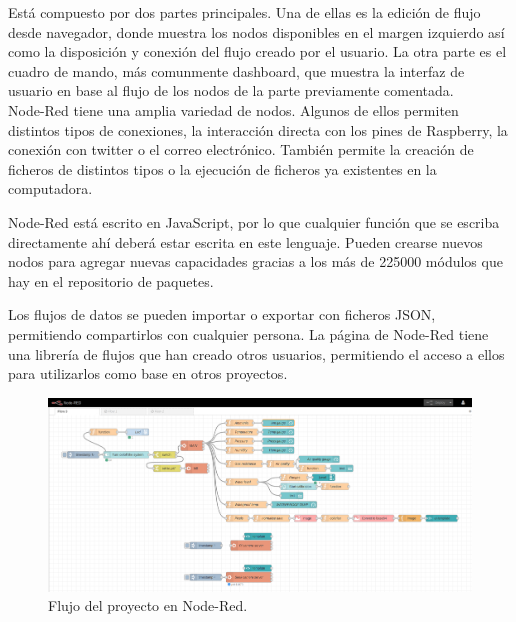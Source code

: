 Está compuesto por dos partes principales. Una de ellas es la edición de flujo desde navegador, donde muestra los nodos disponibles en el margen izquierdo así como la disposición y conexión del flujo creado por el usuario. La otra parte es el cuadro de mando, más comunmente dashboard, que muestra la interfaz de usuario en base al flujo de los nodos de la parte previamente comentada.\\

Node-Red tiene una amplia variedad de nodos. Algunos de ellos permiten distintos tipos de conexiones, la interacción directa con los pines de Raspberry, la conexión con twitter o el correo electrónico. También permite la creación de ficheros de distintos tipos o la ejecución de ficheros ya existentes en la computadora.

Node-Red está escrito en JavaScript, por lo que cualquier función que se escriba directamente ahí deberá estar escrita en este lenguaje. Pueden crearse nuevos nodos para agregar nuevas capacidades gracias a los más de 225000 módulos que hay en el repositorio de paquetes.

Los flujos de datos se pueden importar o exportar con ficheros JSON, permitiendo compartirlos con cualquier persona. La página de Node-Red tiene una librería de flujos que han creado otros usuarios, permitiendo el acceso a ellos para utilizarlos como base en otros proyectos.\\
\begin{figure} [h!]
  \begin{center}
    \includegraphics[width=15cm]{figs/flujo}
  \end{center}
  \caption{Flujo del proyecto en Node-Red.}
  \label{fig:flow}
\end{figure}\\

